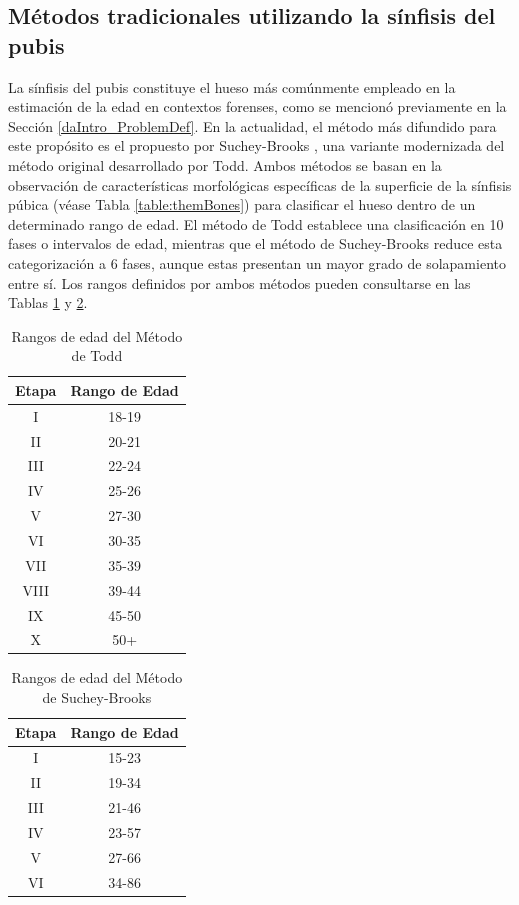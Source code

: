 \subsection{Métodos tradicionales utilizando la sínfisis del pubis}

La sínfisis del pubis constituye el hueso más comúnmente empleado en la estimación de la edad en contextos forenses, como se mencionó previamente en la Sección \ref{daIntro_ProblemDef}. En la actualidad, el método más difundido para este propósito es el propuesto por Suchey-Brooks \cite{RefWorks:RefID:20-brooks1990skeletal}, una variante modernizada del método original desarrollado por Todd. Ambos métodos se basan en la observación de características morfológicas específicas de la superficie de la sínfisis púbica (véase Tabla \ref{table:themBones}) para clasificar el hueso dentro de un determinado rango de edad. El método de Todd establece una clasificación en 10 fases o intervalos de edad, mientras que el método de Suchey-Brooks reduce esta categorización a 6 fases, aunque estas presentan un mayor grado de solapamiento entre sí. Los rangos definidos por ambos métodos pueden consultarse en las Tablas \ref{table:age_todd_} y \ref{table:age_suchey_brooks}.

\begin{table}[h]
\centering
\begin{tabular}{|c|c|}
\hline
\rowcolor[HTML]{FFCB2F} 
{Etapa} & {Rango de Edad} \\ \hline
I & 18-19 \\ \hline
II & 20-21 \\ \hline
III & 22-24 \\ \hline
IV & 25-26 \\ \hline
V & 27-30 \\ \hline
VI & 30-35 \\ \hline
VII & 35-39 \\ \hline
VIII & 39-44 \\ \hline
IX & 45-50 \\ \hline
X & 50+ \\ \hline
\end{tabular}
\caption{Rangos de edad del Método de Todd}
\label{table:age_todd_}
\end{table}

\begin{table}[h]
\centering
\begin{tabular}{|c|c|}
\hline
\rowcolor[HTML]{FFCB2F} 
{Etapa} & {Rango de Edad} \\ \hline
I & 15-23 \\ \hline
II & 19-34 \\ \hline
III & 21-46 \\ \hline
IV & 23-57 \\ \hline
V & 27-66 \\ \hline
VI & 34-86 \\ \hline
\end{tabular}
\caption{Rangos de edad del Método de Suchey-Brooks}
\label{table:age_suchey_brooks}
\end{table}

